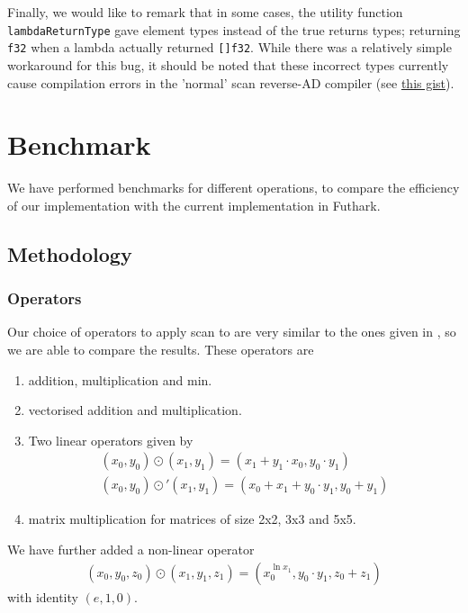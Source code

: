 \documentclass{article}
\begin{document}
Finally, we would like to remark that in some cases, the utility function \lstinline{lambdaReturnType} gave element types instead of the true returns types; returning \lstinline{f32} when a lambda actually returned \lstinline{[]f32}. While there was a relatively simple workaround for this bug, it should be noted that these incorrect types currently cause compilation errors in the 'normal' scan reverse-AD compiler (see \href{https://gist.github.com/p-adema/c8fc4fd5823baca18d90385370aeda5d}{this gist}).

\newpage
\section{Benchmark}
We have performed benchmarks for different operations,
to compare the efficiency of our implementation with the current implementation in Futhark.

\subsection{Methodology}
\subsubsection*{Operators}
Our choice of operators to apply scan to are very similar to the ones given
in \cite{Futhark}, so we are able to compare the results.
These operators are
\begin{enumerate}

	\item addition, multiplication and min.
	\item vectorised addition and multiplication.
	\item Two linear operators given by
	      \begin{align*}
		      (x_{0},y_{0}) \odot (x_{1},y_{1})
		      =
		      (x_{1} + y_{1}\cdot x_{0}, y_{0}\cdot y_{1}) \\
		      (x_{0},y_{0}) \odot' (x_{1},y_{1})
		      =
		      (x_{0} + x_{1} + y_{0}\cdot y_{1}, y_{0}+ y_{1})
	      \end{align*}
	\item matrix multiplication for matrices of size 2x2, 3x3 and 5x5.
\end{enumerate}
We have further added a non-linear operator
\begin{align*}
	(x_{0},y_{0}, z_{0}) \odot (x_{1},y_{1}, z_{1})
	=
	(x_{0}^{\ln x_{1}},y_{0}\cdot y_{1}, z_{0}+z_{1})
\end{align*}
with identity \((e,1,0)\).
\end{document}
